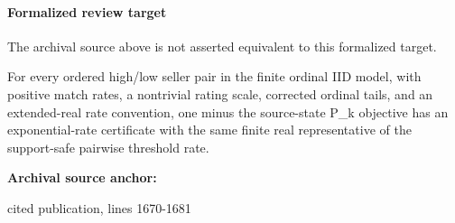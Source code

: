 \documentclass[10pt]{article}
\begin{document}


\paragraph{Formalized review target}
The archival source above is not asserted equivalent to this formalized target.
\begin{ReviewVerbatim}
For every ordered high/low seller pair in the finite ordinal IID model, with positive match rates, a nontrivial rating scale, corrected ordinal tails, and an extended-real rate convention, one minus the source-state P_k objective has an exponential-rate certificate with the same finite real representative of the support-safe pairwise threshold rate.
\end{ReviewVerbatim}

\textbf{Archival source anchor:} {\footnotesize\raggedright cited publication, lines 1670-\allowbreak{}1681\par}
\end{document}
